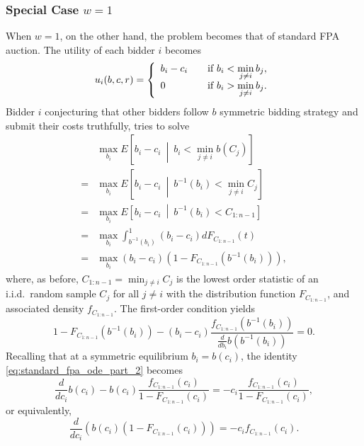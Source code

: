 \subsubsection{Special Case $w=1$} %
\label{ssub:special_case_w_1_}
When $w=1$, on the other hand, the problem becomes that of standard FPA auction. The utility of each bidder $i$ becomes
\begin{equation}
	\label{eq:sellers_utility_w_1}
	u_i(b,c,r) = \left\{
	\begin{array}{l l}
		b_i-c_i & \quad\text{if } b_i < \displaystyle\min_{j\neq i}b_j,\\
		0 & \quad\text{if } b_i > \displaystyle\min_{j\neq i}b_j.
	\end{array}\right.
\end{equation}
Bidder $i$ conjecturing that other bidders follow $b$ symmetric bidding strategy and submit their costs truthfully, tries to solve
\begin{align}
	\label{eq:standard_fpa_ode_part_1}
	&\max_{b_i}E \left[ b_i-c_i \:\middle\vert\: b_i < \min_{j\neq i}b(C_j) \right] \nonumber\\
	= &\max_{b_i}E \left[ b_i-c_i \:\middle\vert\: b^{-1}(b_i) < \min_{j\neq i}C_j \right] \nonumber\\
	= &\max_{b_i}E \left[ b_i-c_i \:\middle\vert\: b^{-1}(b_i) < C_{1:n-1} \right] \nonumber\\
	= &\max_{b_i} \int_{b^{-1}(b_i)}^{1} (b_i-c_i)dF_{C_{1:n-1}}(t) \nonumber\\
	= &\max_{b_i} (b_i-c_i)(1 - F_{C_{1:n-1}}(b^{-1}(b_i))),
\end{align}
where, as before, $C_{1:n-1} = \min_{j\neq i}C_j$ is the lowest order statistic of an i.i.d.~random sample $C_j$ for all $j\neq i$ with the distribution function $F_{C_{1:n-1}}$, and associated density $f_{C_{1:n-1}}$. The first-order condition yields
\begin{equation}
	\label{eq:standard_fpa_ode_part_2}
	1 - F_{C_{1:n-1}}(b^{-1}(b_i)) - (b_i - c_i)\frac{f_{C_{1:n-1}}(b^{-1}(b_i))}{\frac{d}{db_i}b(b^{-1}(b_i))} = 0.
\end{equation}
Recalling that at a symmetric equilibrium $b_i=b(c_i)$, the identity \eqref{eq:standard_fpa_ode_part_2} becomes
\begin{equation}
	\label{eq:standard_fpa_ode_part_3}
	\frac{d}{dc_i}b(c_i) - b(c_i)\frac{f_{C_{1:n-1}}(c_i)}{1 - F_{C_{1:n-1}}(c_i)} = -c_i \frac{f_{C_{1:n-1}}(c_i)}{1 - F_{C_{1:n-1}}(c_i)},
\end{equation}
or equivalently,
\begin{equation*}
	\frac{d}{dc_i}(b(c_i)(1 - F_{C_{1:n-1}}(c_i))) = -c_if_{C_{1:n-1}}(c_i).
\end{equation*}
